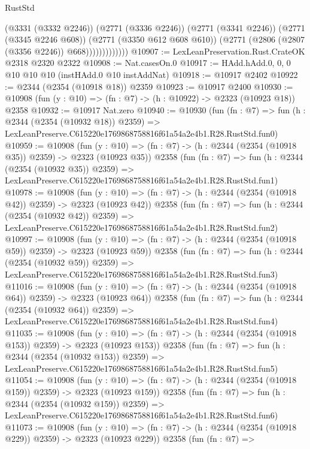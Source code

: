 \begin{lexlean}{RustStd}
\begin{coremodule}
                          (@3331 (@3332 @2246))
                          (@2771 (@3336 @2246))
                          (@2771 (@3341 @2246))
                          (@2771 (@3345 @2246 @608))
                          (@2771 (@3350 @612 @608 @610))
                          (@2771 (@2806 (@2807 (@3356 @2246)) @668)))))))))))))
@10907 := LexLeanPreservation.Rust.CrateOK @2318 @2320 @2322
@10908 := Nat.casesOn.{0}
@10917 := HAdd.hAdd.{0, 0, 0} @10 @10 @10 (instHAdd.{0} @10 instAddNat)
@10918 := @10917 @2402
@10922 := @2344 (@2354 (@10918 @18)) @2359
@10923 := @10917 @2400
@10930 := @10908 (fun (y : @10) => (fn : @7) -> (h : @10922) -> @2323 (@10923 @18)) @2358
@10932 := @10917 Nat.zero
@10940 := @10930
    (fun (fn : @7) =>
    fun (h : @2344 (@2354 (@10932 @18)) @2359) =>
    LexLeanPreserve.C615220e1769868758816f61a54a2e4b1.R28.RustStd.fun0)
@10959 := @10908
    (fun (y : @10) => (fn : @7) -> (h : @2344 (@2354 (@10918 @35)) @2359) -> @2323 (@10923 @35))
    @2358
    (fun (fn : @7) =>
    fun (h : @2344 (@2354 (@10932 @35)) @2359) =>
    LexLeanPreserve.C615220e1769868758816f61a54a2e4b1.R28.RustStd.fun1)
@10978 := @10908
    (fun (y : @10) => (fn : @7) -> (h : @2344 (@2354 (@10918 @42)) @2359) -> @2323 (@10923 @42))
    @2358
    (fun (fn : @7) =>
    fun (h : @2344 (@2354 (@10932 @42)) @2359) =>
    LexLeanPreserve.C615220e1769868758816f61a54a2e4b1.R28.RustStd.fun2)
@10997 := @10908
    (fun (y : @10) => (fn : @7) -> (h : @2344 (@2354 (@10918 @59)) @2359) -> @2323 (@10923 @59))
    @2358
    (fun (fn : @7) =>
    fun (h : @2344 (@2354 (@10932 @59)) @2359) =>
    LexLeanPreserve.C615220e1769868758816f61a54a2e4b1.R28.RustStd.fun3)
@11016 := @10908
    (fun (y : @10) => (fn : @7) -> (h : @2344 (@2354 (@10918 @64)) @2359) -> @2323 (@10923 @64))
    @2358
    (fun (fn : @7) =>
    fun (h : @2344 (@2354 (@10932 @64)) @2359) =>
    LexLeanPreserve.C615220e1769868758816f61a54a2e4b1.R28.RustStd.fun4)
@11035 := @10908
    (fun (y : @10) => (fn : @7) -> (h : @2344 (@2354 (@10918 @153)) @2359) -> @2323 (@10923 @153))
    @2358
    (fun (fn : @7) =>
    fun (h : @2344 (@2354 (@10932 @153)) @2359) =>
    LexLeanPreserve.C615220e1769868758816f61a54a2e4b1.R28.RustStd.fun5)
@11054 := @10908
    (fun (y : @10) => (fn : @7) -> (h : @2344 (@2354 (@10918 @159)) @2359) -> @2323 (@10923 @159))
    @2358
    (fun (fn : @7) =>
    fun (h : @2344 (@2354 (@10932 @159)) @2359) =>
    LexLeanPreserve.C615220e1769868758816f61a54a2e4b1.R28.RustStd.fun6)
@11073 := @10908
    (fun (y : @10) => (fn : @7) -> (h : @2344 (@2354 (@10918 @229)) @2359) -> @2323 (@10923 @229))
    @2358
    (fun (fn : @7) =>

\end{coremodule}
\end{lexlean}
